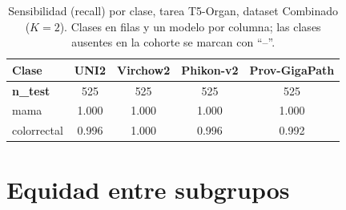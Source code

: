 \begin{table}[H]
\centering
\caption{Sensibilidad (recall) por clase, tarea T5-Organ, dataset Combinado ($K=2$). Clases en filas y un modelo por columna; las clases ausentes en la cohorte se marcan con ``--''.}
\label{tab:anexo_organ_sensibilidad}
\begin{tabular}{l c c c c}
\toprule
\textbf{Clase} & \textbf{UNI2} & \textbf{Virchow2} & \textbf{Phikon-v2} & \textbf{Prov-GigaPath} \\
\midrule
\textbf{n\_test} & 525 & 525 & 525 & 525 \\
mama & 1.000 & 1.000 & 1.000 & 1.000 \\
colorrectal & 0.996 & 1.000 & 0.996 & 0.992 \\
\bottomrule
\end{tabular}
\end{table}

\section{Equidad entre subgrupos}
\label{anexo:fairness}

